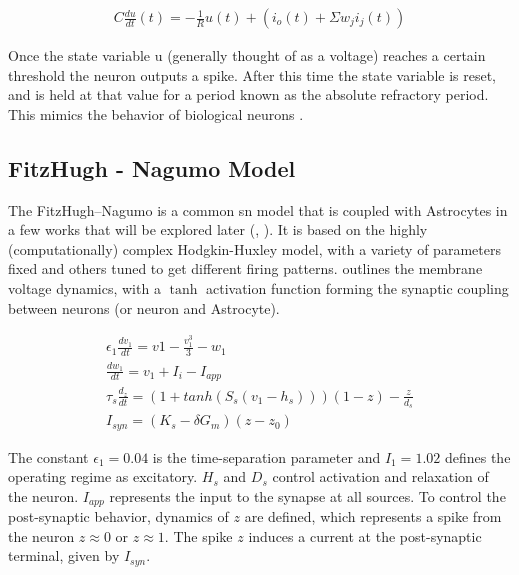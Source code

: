     \begin{align}
        C \frac{du}{dt}(t) = -\frac{1}{R}u(t)+(i_o(t) + \Sigma w_ji_j(t))
    \end{align}
    
    Once the state variable u (generally thought of as a voltage) reaches a
    certain threshold the neuron outputs a spike. After this time the state
    variable is reset, and is held at that value for a period known as the
    absolute refractory period. This mimics the behavior of biological neurons
    \cite{ponulak_2011}.



    \subsection{FitzHugh - Nagumo Model}
    The FitzHugh–Nagumo is a common \Gls{sn} model that is coupled with
    Astrocytes in a few works that will be explored later (\cite{postnov_2009},
    \cite{postnov_2007}). It is based on the highly (computationally) complex
    Hodgkin-Huxley model, with a variety of parameters fixed and others tuned to
    get different firing patterns. \parencite{postnov_2009} outlines the membrane
    voltage dynamics, with a $\tanh$ activation function forming the synaptic
    coupling between neurons (or neuron and Astrocyte).

    \begin{align}
      \epsilon_1 \frac{dv_1}{dt} = v1 - \frac{v_1^3}{3} -
      w_1 \label{eq:fn_neuron}  \\
      \frac{dw_1}{dt} = v_1 + I_i - I_{app} \\
      \tau_s \frac{d_z}{dt} = (1 + tanh(S_s(v_1 - h_s)))(1 - z) - \frac{z}{d_s}
      \\
      I_{syn} = (K_s - \delta G_m)(z - z_0)
    \end{align}

    The constant $\epsilon_1 = 0.04$ is the time-separation parameter and
    $I_1 = 1.02$ defines the operating regime as excitatory. $H_s$ and $D_s$
    control activation and relaxation of the neuron. $I_{app}$ represents the
    input to the synapse at all sources. To control the post-synaptic behavior,
    dynamics of $z$ are defined, which represents a spike from the neuron
    $z \approx 0$ or $z \approx 1$. The spike $z$ induces a current at the
    post-synaptic terminal, given by $I_{syn}$.

